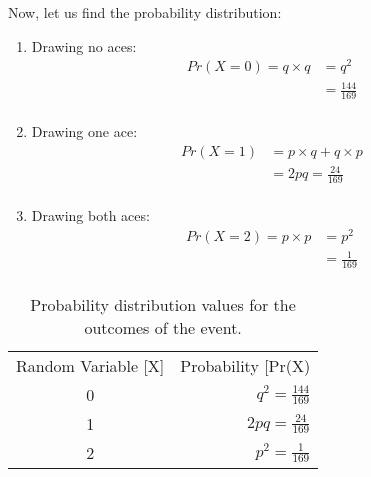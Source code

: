 \documentclass[journal,12pt,twocolumn]{IEEEtran}
\begin{document}
\section*{}
Now, let us find the probability distribution:
\begin{enumerate}
    \item Drawing no aces:
    \begin{align}
        Pr(X=0) = q \times q &= q^2\\
        &= \frac{144}{169}\\\nonumber
    \end{align}
    \item Drawing one ace:
    \begin{align}
        Pr(X=1) &= p \times q + q \times p\\
        &= 2pq = \frac{24}{169}\\\nonumber
    \end{align}
    \item Drawing both aces:
    \begin{align}
        Pr(X=2) = p \times p &= p^2\\
        &= \frac{1}{169}\\\nonumber
    \end{align}
\end{enumerate}

\begin{table}[H]
    \centering
        \begin{tabular}{|c|r|}
            \hline
            \multirow{2}{*}{\normalsize{Random Variable [X]}} &   \multirow{2}{*}{\normalsize{Probability [Pr(X)}}    \\
                                        &                                                \\\hline
            \multirow{2}{*}{\large{0}}  &   \multirow{2}{*}{\large{\(q^2 = \frac{144}{169}\)}} \\
                                        &                                                \\\hline
            \multirow{2}{*}{\large{1}}  &   \multirow{2}{*}{\large{\(2pq = \frac{24}{169}\)}}  \\
                                        &                                                \\\hline
            \multirow{2}{*}{\large{2}}  &   \multirow{2}{*}{\large{\(p^2 = \frac{1}{169}\)}}   \\
                                        &                                                \\\hline
    \end{tabular}
    \caption{Probability distribution values for the outcomes of the event.}
    \label{Probabilty Distribution Table}
\end{table}
\end{document}
